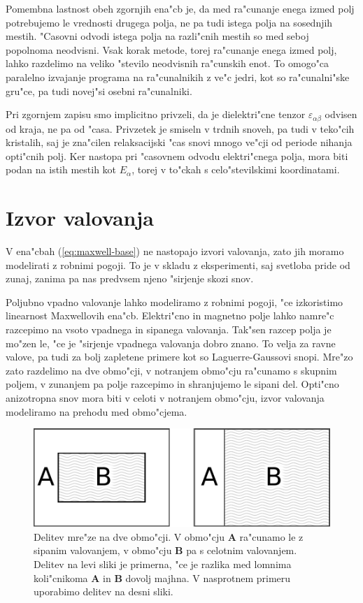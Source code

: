 \documentclass[12pt,twoside,openright,final]{report}
\begin{document}
Pomembna lastnost obeh zgornjih ena"cb je, da med ra"cunanje enega izmed polj potrebujemo le vrednosti drugega polja, ne pa tudi istega polja na sosednjih mestih. 
"Casovni odvodi istega polja na razli"cnih mestih so med seboj popolnoma neodvisni. 
Vsak korak metode, torej ra"cunanje enega izmed polj, lahko razdelimo na veliko "stevilo neodvisnih ra"cunskih enot. 
To omogo"ca paralelno izvajanje programa na ra"cunalnikih z ve"c jedri, kot so ra"cunalni"ske gru"ce, pa tudi novej"si osebni ra"cunalniki. 

Pri zgornjem zapisu smo implicitno privzeli, da je dielektri"cne tenzor $\varepsilon_{\alpha\beta}$ odvisen od kraja, ne pa od "casa. 
Privzetek je smiseln v trdnih snoveh, pa tudi v teko"cih kristalih, saj je zna"cilen relaksacijski "cas snovi mnogo ve"cji od periode nihanja opti"cnih polj. 
Ker nastopa pri "casovnem odvodu elektri"cnega polja, mora biti podan na istih mestih kot $E_\alpha$, torej v to"ckah s celo"stevilskimi koordinatami. 

\section{Izvor valovanja}

V ena"cbah (\ref{eq:maxwell-base}) ne nastopajo izvori valovanja, zato jih moramo modelirati z robnimi pogoji. 
To je v skladu z eksperimenti, saj svetloba pride od zunaj, zanima pa nas predvsem njeno "sirjenje skozi snov. 

Poljubno vpadno valovanje lahko modeliramo z robnimi pogoji, "ce izkoristimo linearnost Maxwellovih ena"cb. 
Elektri"cno in magnetno polje lahko namre"c razcepimo na vsoto vpadnega in sipanega valovanja\cite{taflove}. 
Tak"sen razcep polja je mo"zen le, "ce je "sirjenje vpadnega valovanja dobro znano. 
To velja za ravne valove, pa tudi za bolj zapletene primere kot so Laguerre-Gaussovi snopi. 
Mre"zo zato razdelimo na dve obmo"cji, v notranjem obmo"cju ra"cunamo s skupnim poljem, v zunanjem pa polje razcepimo in shranjujemo le sipani del.
Opti"cno anizotropna snov mora biti v celoti v notranjem obmo"cju, izvor valovanja modeliramo na prehodu med obmo"cjema. 

\begin{figure}[h]
 \centering
 \includegraphics[width=.8\textwidth]{wave-source-regions}
 \caption{Delitev mre"ze na dve obmo"cji. V obmo"cju \textbf{A} ra"cunamo le z sipanim valovanjem, v obmo"cju \textbf{B} pa s celotnim valovanjem. Delitev na levi sliki je primerna, "ce je razlika med lomnima koli"cnikoma \textbf{A} in \textbf{B} dovolj majhna. V nasprotnem primeru uporabimo delitev na desni sliki. }
 \label{fig:wave-source-regions}
\end{figure}
\end{document}
